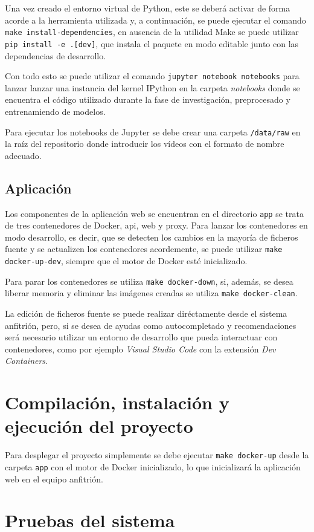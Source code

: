 Una vez creado el entorno virtual de Python, este se deberá activar de forma
acorde a la herramienta utilizada y, a continuación, se puede ejecutar el
comando \texttt{make install-dependencies}, en ausencia de la utilidad Make se
puede utilizar \texttt{pip install -e .[dev]}, que instala el paquete en modo
editable junto con las dependencias de desarrollo.

Con todo esto se puede utilizar el comando \texttt{jupyter notebook notebooks}
para lanzar lanzar una instancia del kernel IPython en la carpeta
\textit{notebooks} donde se encuentra el código utilizado durante la fase de
investigación, preprocesado y entrenamiendo de modelos.

Para ejecutar los notebooks de Jupyter se debe crear una carpeta
\texttt{/data/raw} en la raíz del repositorio donde introducir los vídeos con el
formato de nombre adecuado.


\subsection{Aplicación}

Los componentes de la aplicación web se encuentran en el directorio \texttt{app}
se trata de tres contenedores de Docker, api, web y proxy. Para lanzar los
contenedores en modo desarrollo, es decir, que se detecten los cambios en la
mayoría de ficheros fuente y se actualizen los contenedores acordemente, se
puede utilizar \texttt{make docker-up-dev}, siempre que el motor de Docker esté
inicializado.

Para parar los contenedores se utiliza \texttt{make docker-down}, si, además, se
desea liberar memoria y eliminar las imágenes creadas se utiliza \texttt{make
      docker-clean}.

La edición de ficheros fuente se puede realizar diréctamente desde el sistema
anfitrión, pero, si se desea de ayudas como autocompletado y recomendaciones
será necesario utilizar un entorno de desarrollo que pueda interactuar con
contenedores, como por ejemplo \textit{Visual Studio Code} con la extensión
\textit{Dev Containers}.


\section{Compilación, instalación y ejecución del proyecto}

Para desplegar el proyecto simplemente se debe ejecutar \texttt{make docker-up}
desde la carpeta \texttt{app} con el motor de Docker inicializado, lo que
inicializará la aplicación web en el equipo anfitrión.


\section{Pruebas del sistema}
